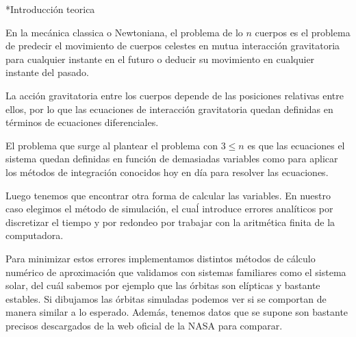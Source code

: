 \documentclass[12pt,titlepage]{article}
\newenvironment{usection}[1]{\newpage\begin{section}*{#1}	\addcontentsline{toc}{section}{#1}}{\end{section}}
\begin{document}


\palabraClave{}

\begin{titlepage}
\maketitle
\end{titlepage}
\tableofcontents
\newpage

	\begin{usection}{Introducción teorica}

		En la mecánica classica o Newtoniana, el problema de lo $n$
		cuerpos es el problema de predecir el movimiento de cuerpos
		celestes en mutua interacción gravitatoria para cualquier
		instante en el futuro o deducir su movimiento en cualquier
		instante del pasado.

		La acción gravitatoria entre los cuerpos depende de las
		posiciones relativas entre ellos, por lo que las ecuaciones de
		interacción gravitatoria quedan definidas en términos de
		ecuaciones diferenciales.

		El problema que surge al plantear el problema con $3 \leq n$ es
		que las ecuaciones el sistema quedan definidas en función de
		demasiadas variables como para aplicar los métodos de integración
		conocidos hoy en día para resolver las ecuaciones.

		Luego tenemos que encontrar otra forma de calcular las
		variables. En nuestro caso elegimos el método de simulación,
		el cuaĺ introduce errores analíticos por discretizar el tiempo y
		por redondeo por trabajar con la aritmética finita de la
		computadora.

		Para minimizar estos errores implementamos distintos métodos de
		cálculo numérico de aproximación que validamos con sistemas
		familiares como el sistema solar, del cuál sabemos por ejemplo
		que las órbitas son elípticas y bastante estables. Si dibujamos
		las órbitas simuladas podemos ver si se comportan de manera
		similar a lo esperado. Además, tenemos datos que se supone son
		bastante precisos descargados de la web oficial de la NASA para
		comparar.

	\end{usection}
	
\end{document}
